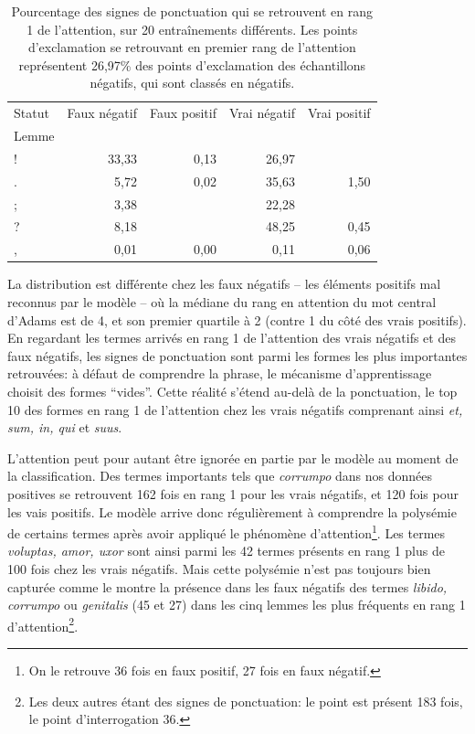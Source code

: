 \begin{table}[]
    \centering
    \begin{tabular}{l|rrrr}
    \toprule
    Statut &  Faux négatif & Faux positif &  Vrai négatif & Vrai positif \\
    Lemme &               &              &               &              \\
    \midrule
    !     &         33,33 &         0,13 &         26,97 &              \\
    .     &          5,72 &         0,02 &         35,63 &         1,50 \\
    ;     &          3,38 &              &         22,28 &              \\
    ?     &          8,18 &              &         48,25 &         0,45 \\
    ,     &          0,01 &         0,00 &          0,11 &         0,06 \\
    \bottomrule
    \end{tabular}
    \caption{Pourcentage des signes de ponctuation qui se retrouvent en rang 1 de l'attention, sur 20 entraînements différents. Les points d'exclamation se retrouvant en premier rang de l'attention représentent 26,97\% des points d'exclamation des échantillons négatifs, qui sont classés en négatifs.}
    \label{tab:chap4:ponctuation-attention}
\end{table}

La distribution est différente chez les faux négatifs -- les éléments positifs mal reconnus par le modèle -- où la médiane du rang en attention du mot central d'Adams est de 4, et son premier quartile à 2 (contre 1 du côté des vrais positifs). En regardant les termes arrivés en rang 1 de l'attention des vrais négatifs et des faux négatifs, les signes de ponctuation sont parmi les formes les plus importantes retrouvées: à défaut de comprendre la phrase, le mécanisme d'apprentissage choisit des formes \enquote{vides}. Cette réalité s'étend au-delà de la ponctuation, le top 10 des formes en rang 1 de l'attention chez les vrais négatifs comprenant ainsi \textit{et, sum, in, qui} et \textit{suus}. 

L'attention peut pour autant être ignorée en partie par le modèle au moment de la classification. Des termes importants tels que \textit{corrumpo} dans nos données positives se retrouvent 162 fois en rang 1 pour les vrais négatifs, et 120 fois pour les vais positifs. Le modèle arrive donc régulièrement à comprendre la polysémie de certains termes après avoir appliqué le phénomène d'attention\footnote{On le retrouve 36 fois en faux positif, 27 fois en faux négatif.}. Les termes \textit{voluptas, amor, uxor} sont ainsi parmi les 42 termes présents en rang 1 plus de 100 fois chez les vrais négatifs. Mais cette polysémie n'est pas toujours bien capturée comme le montre la présence dans les faux négatifs des termes \textit{libido, corrumpo} ou \textit{genitalis} (45 et 27) dans les cinq lemmes les plus fréquents en rang 1 d'attention\footnote{Les deux autres étant des signes de ponctuation: le point est présent 183 fois, le point d'interrogation 36.}.

